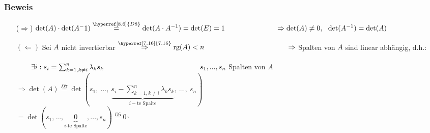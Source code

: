\documentclass[12pt,titlepage, pdf]{article}
\newcommand{\rg}{\textrm{rg}}
\newcommand{\qed}{\hfill$\square$}
\renewcommand{\>}{\rightarrow}
\renewcommand{\*}{\cdot}
\begin{document}
\subsubsection*{Beweis}
\begin{itemize}
	\item[($\Rightarrow$)] $\det(A) \cdot \det(A^-1) \overset{\hyperref[8.6]{D8}}{=} \det(A \cdot A^{-1}) = \det(E) = 1\\
	\noindent\hspace*{25mm} \Rightarrow \det(A) \neq 0 ,~~ \det(A^{-1}) = \det(A)$
	\item[$(\Leftarrow)$] Sei $A$ nicht invertierbar $\overset{\hyperref[7.16]{7.16}}{\Rightarrow} \rg(A) < n \\
	\noindent\hspace*{40.5mm}\Rightarrow$ Spalten von $A$ sind linear abhängig, d.h.:\\
	\\
	\noindent\hspace*{40.5mm}$\qquad\exists i: s_i = \sum_{k = 1, k\neq i}^{n} \lambda_k s_k\\\noindent\hspace*{40.5mm}\qquad s_1,...,s_n$ Spalten von $A$ \\
	\noindent\hspace*{40.5mm}$\Rightarrow \det(A) \overset{\hyperref[8.6]{D7}}{=} \det(s_1,~...,~\underbrace{s_i - \sum_{k = 1, k\neq i}^{n} \lambda_k s_k}_{i-\text{te Spalte}},~...,~s_n)$\\
	\noindent\hspace*{57.5mm}$= \det(s_1,...,\underbrace{0}_{i\text{-te Spalte}},...,s_n) \overset{\hyperref[8.6]{D5}}{=} 0$\qed
\end{itemize}
\end{document}
